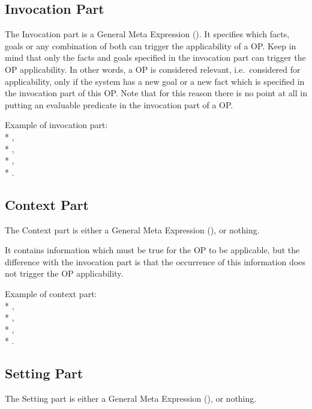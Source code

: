 \subsection{Invocation Part}

The Invocation part is a General Meta Expression (). It specifies which facts, goals or any combination of both can
trigger the applicability of a OP. Keep in mind that only the facts
and goals specified in the invocation part can trigger the OP applicability. In
other words, a OP is considered relevant, i.e.\  considered for applicability,
only if the system has a new goal or a new fact which is specified in
the invocation part of this OP. Note that for this reason there is no point at
all in putting an evaluable predicate in the invocation part of a OP.

Example of invocation part: \\*
, \\*
, \\*
, \\*
.

\subsection{Context Part}

The Context part is either a General Meta Expression (), or nothing.

It contains information which must be true for the OP to be applicable, but the
difference with the invocation part is that the occurrence of this information
does not trigger the OP applicability.

Example of context part: \\*
, \\*
, \\*
, \\*
.

\subsection{Setting Part}

The Setting part is either a General Meta Expression (), or nothing.

